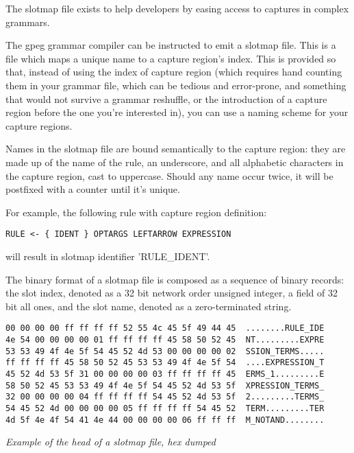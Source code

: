 The slotmap file exists to help developers by easing access to
captures in complex grammars.

The gpeg grammar compiler can be instructed to emit a slotmap file.
This is a file which maps a unique name to a capture region's index.
This is provided so that, instead of using the index of capture region
(which requires hand counting them in your grammar file, which can be
tedious and error-prone, and something that would not survive
a grammar reshuffle, or the introduction of a capture region before
the one you're interested in), you can use a naming scheme for your
capture regions.

Names in the slotmap file are bound semantically to the capture region:
they are made up of the name of the rule,
an underscore, and all alphabetic characters in the capture region,
cast to uppercase. Should any name occur twice, it will be postfixed with
a counter until it's unique.

For example, the following rule with capture region definition:

\begin{myquote}
\begin{verbatim}
RULE <- { IDENT } OPTARGS LEFTARROW EXPRESSION
\end{verbatim}
\end{myquote}

will result in slotmap identifier 'RULE\_IDENT'.

The binary format of a slotmap file is composed as a sequence of binary records:
the slot index, denoted as a 32 bit network order unsigned integer, a
field of 32 bit all ones, and the slot name, denoted as a zero-terminated
string.

\begin{myquote}
\begin{verbatim}
00 00 00 00 ff ff ff ff 52 55 4c 45 5f 49 44 45  ........RULE_IDE
4e 54 00 00 00 00 01 ff ff ff ff 45 58 50 52 45  NT.........EXPRE
53 53 49 4f 4e 5f 54 45 52 4d 53 00 00 00 00 02  SSION_TERMS.....
ff ff ff ff 45 58 50 52 45 53 53 49 4f 4e 5f 54  ....EXPRESSION_T
45 52 4d 53 5f 31 00 00 00 00 03 ff ff ff ff 45  ERMS_1.........E
58 50 52 45 53 53 49 4f 4e 5f 54 45 52 4d 53 5f  XPRESSION_TERMS_
32 00 00 00 00 04 ff ff ff ff 54 45 52 4d 53 5f  2.........TERMS_
54 45 52 4d 00 00 00 00 05 ff ff ff ff 54 45 52  TERM.........TER
4d 5f 4e 4f 54 41 4e 44 00 00 00 00 06 ff ff ff  M_NOTAND........
\end{verbatim}
\end{myquote}
\textit{Example of the head of a slotmap file, hex dumped}

